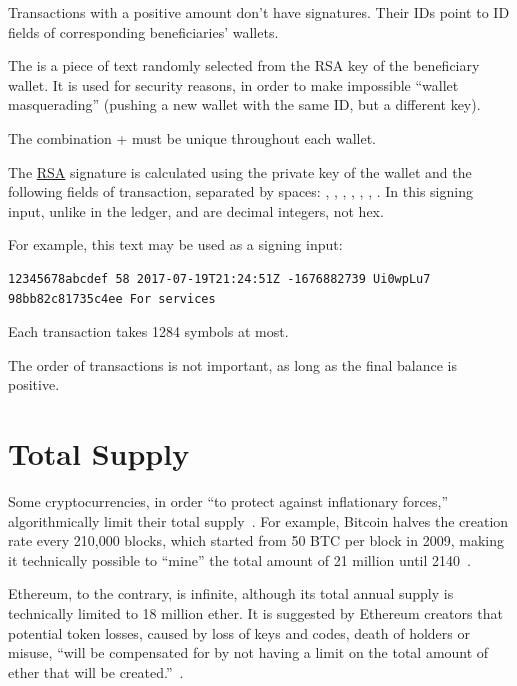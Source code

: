 \documentclass{main}
\begin{document}
Transactions with a positive amount don't have signatures.
Their IDs point to ID fields of corresponding beneficiaries' wallets.

The  is a piece of text randomly selected from the RSA key
of the beneficiary wallet. It is used for security reasons, in order
to make impossible ``wallet masquerading'' (pushing a new wallet with the
same ID, but a different key).

The combination + must be unique throughout each wallet.

The \href{https://en.wikipedia.org/wiki/RSA_(cryptosystem)}{RSA}
signature is calculated using the private key of the
wallet and the following fields of transaction, separated by spaces:
, , , , , , .
In this signing input, unlike in the ledger,
 and  are decimal integers, not hex.

For example, this text may be used as a signing input:

\begin{verbatim}
12345678abcdef 58 2017-07-19T21:24:51Z -1676882739 Ui0wpLu7 98bb82c81735c4ee For services
\end{verbatim}

Each transaction takes 1284 symbols at most.

The order of transactions is not important, as long as the final balance is positive.

\section{Total Supply}\label{sec:supply}

Some cryptocurrencies, in order ``to protect against inflationary forces,''
algorithmically limit their total supply~\parencite{bohr2014}.
For example, Bitcoin halves the creation rate every 210,000 blocks,
which started from 50 BTC per block in 2009,
making it technically possible to ``mine'' the total amount
of 21 million until 2140~\parencite{iwamura2014}.

Ethereum, to the contrary, is infinite, although its total annual
supply is technically limited to 18 million ether. It is suggested
by Ethereum creators that potential token losses, caused by loss of keys and codes, death
of holders or misuse, ``will be compensated for by not having
a limit on the total amount of ether that will be created.''~\parencite{fekkes2018}.
\end{document}

